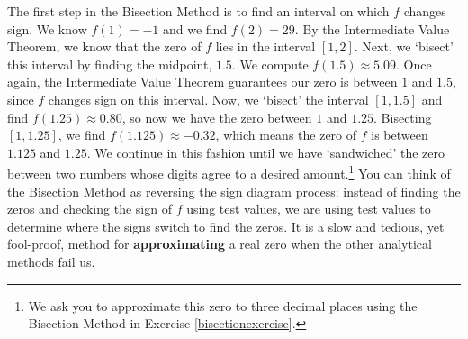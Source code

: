 \documentclass{ximera}
\begin{document}
\label{bisectionmethod}

The first step in the Bisection Method is to find an interval on which $f$ changes sign.  We know $f(1) = -1$ and we find $f(2) = 29$.  By the Intermediate Value Theorem, we know that the zero of $f$ lies in the interval $[1,2]$.  Next, we `bisect' this interval by finding the midpoint,  $1.5$.  We compute  $f(1.5)\approx 5.09$.  Once again, the Intermediate Value Theorem guarantees our zero is between $1$ and $1.5$, since $f$ changes sign on this interval.  Now, we `bisect' the interval $[1,1.5]$ and find $f(1.25) \approx 0.80$, so now we have the zero between $1$ and $1.25$.  Bisecting $[1,1.25]$, we find $f(1.125) \approx -0.32$, which means the zero of $f$ is between $1.125$ and $1.25$.  We continue in this fashion until we have `sandwiched' the zero between two numbers whose digits agree to a desired amount.\footnote{We ask you to approximate this zero to three decimal places using the Bisection Method  in Exercise \ref{bisectionexercise}.} You can think of the Bisection Method as reversing the sign diagram process:  instead of finding the zeros and checking the sign of $f$ using test values, we are using test values to determine where the signs switch to find the zeros.  It is a slow and tedious, yet fool-proof, method for \textbf{approximating} a real zero when the other analytical methods fail us.  



\closegraphsfile
\end{document}
